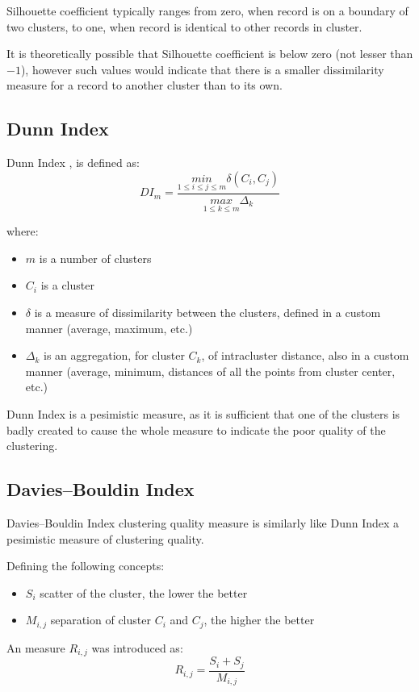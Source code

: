 \documentclass[a4paper, 12pt, oneside]{Thesis} %
\begin{document}
Silhouette coefficient typically ranges from zero, when record is on a boundary of two clusters, to one, when record is identical to other records in cluster.

It is theoretically possible that Silhouette coefficient is below zero (not lesser than $-1$), however such values would indicate that there is a smaller dissimilarity measure for a record to another cluster than to its own.

\subsection{Dunn Index} Dunn Index \cite{dunn1973fuzzy}, is defined as:
$$ DI_m = \frac{\underset{1 \leq i \le j \leq m}{min} \delta(C_i, C_j)}{\underset{1 \leq k \leq m}{max} \Delta_k} $$

where:
\begin{itemize}
\item $m$ is a number of clusters
\item $C_i$ is a cluster
\item $\delta$ is a measure of dissimilarity between the clusters, defined in a custom manner (average, maximum, etc.)
\item $\Delta_k$ is an aggregation, for cluster $C_k$, of intracluster distance, also in a custom manner (average, minimum, distances of all the points from cluster center, etc.) 
\end{itemize}

Dunn Index is a pesimistic measure, as it is sufficient that one of the clusters is badly created to cause the whole measure to indicate the poor quality of the clustering.

\subsection{Davies–Bouldin Index} Davies–Bouldin Index \cite{davies1979cluster} clustering quality measure is similarly like Dunn Index a pesimistic measure of clustering quality.

Defining the following concepts:
\begin{itemize}
\item $S_i$ scatter of the cluster, the lower the better
\item $M_{i,j}$ separation of cluster $C_i$ and $C_j$, the higher the better
\end{itemize}

An measure $R_{i, j}$ was introduced as:
$$ R_{i,j} = \frac{S_i + S_j}{M_{i,j}} $$
\end{document}
